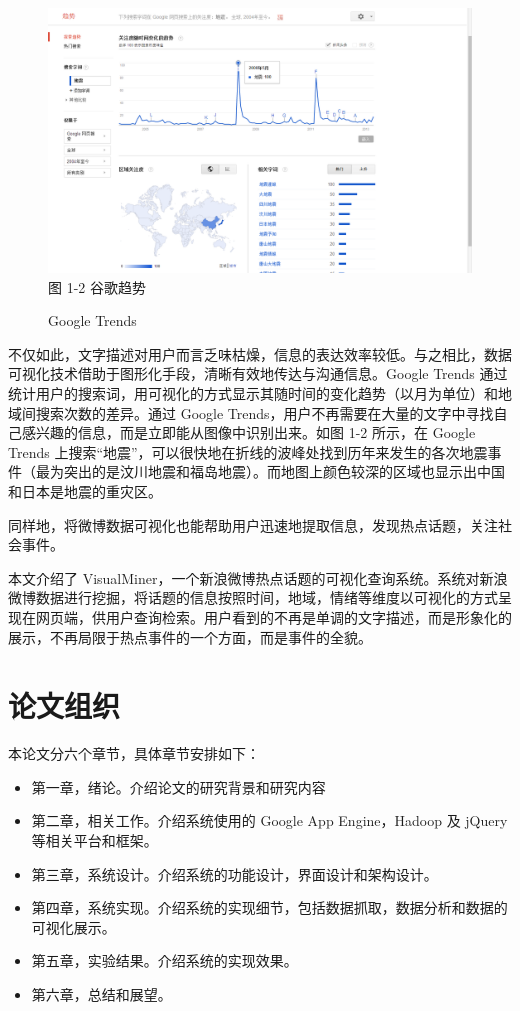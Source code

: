 \begin{figure}[t]
\centering
\includegraphics[width=\textwidth, height=0.35\textheight]{google_trends}
\\
图 1-2 谷歌趋势
\caption{Google Trends}
\end{figure}

不仅如此，文字描述对用户而言乏味枯燥，信息的表达效率较低。与之相比，数据可视化技术\cite{perception}借助于图形化手段，清晰有效地传达与沟通信息。Google Trends 通过统计用户的搜索词，用可视化的方式显示其随时间的变化趋势（以月为单位）和地域间搜索次数的差异。通过 Google Trends，用户不再需要在大量的文字中寻找自己感兴趣的信息，而是立即能从图像中识别出来。如图 1-2 所示，在 Google Trends 上搜索“地震”，可以很快地在折线的波峰处找到历年来发生的各次地震事件（最为突出的是汶川地震和福岛地震）。而地图上颜色较深的区域也显示出中国和日本是地震的重灾区。

同样地，将微博数据可视化也能帮助用户迅速地提取信息，发现热点话题，关注社会事件。

本文介绍了 VisualMiner，一个新浪微博热点话题的可视化查询系统。系统对新浪微博数据进行挖掘，将话题的信息按照时间，地域，情绪等维度以可视化的方式呈现在网页端，供用户查询检索。用户看到的不再是单调的文字描述，而是形象化的展示，不再局限于热点事件的一个方面，而是事件的全貌。


\section{论文组织}
本论文分六个章节，具体章节安排如下：
\begin{itemize}
\item 第一章，绪论。介绍论文的研究背景和研究内容
\item 第二章，相关工作。介绍系统使用的 Google App Engine，Hadoop 及 jQuery 等相关平台和框架。
\item 第三章，系统设计。介绍系统的功能设计，界面设计和架构设计。
\item 第四章，系统实现。介绍系统的实现细节，包括数据抓取，数据分析和数据的可视化展示。
\item 第五章，实验结果。介绍系统的实现效果。
\item 第六章，总结和展望。
\end{itemize} 
